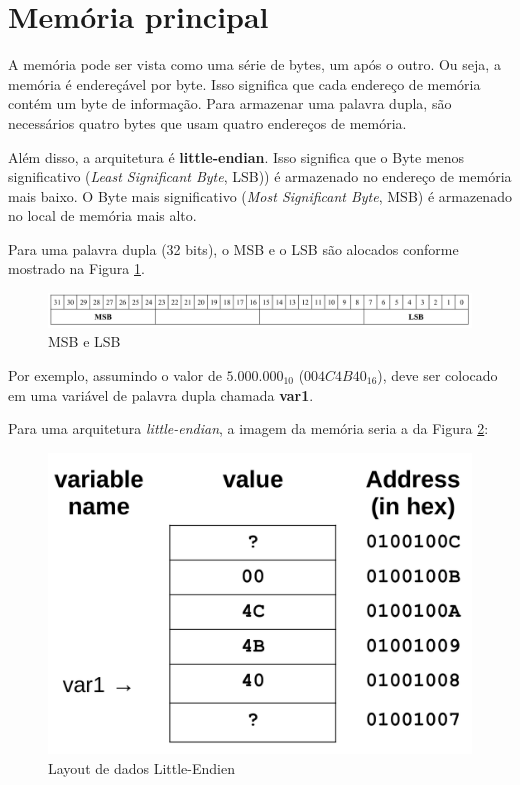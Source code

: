 \section{Memória principal}
A memória pode ser vista como uma série de bytes, um após o outro. Ou seja, a memória é endereçável por byte. Isso significa que cada endereço de memória contém um byte de informação. Para armazenar uma palavra dupla, são necessários quatro bytes que usam quatro endereços de memória.

Além disso, a arquitetura é \textbf{little-endian}. Isso significa que o Byte menos significativo (\textit{Least Significant Byte}, LSB)) é armazenado no endereço de memória mais baixo. O Byte mais significativo (\textit{Most Significant Byte}, MSB) é armazenado no local de memória mais alto.

Para uma palavra dupla (32 bits), o MSB e o LSB são alocados conforme mostrado na Figura \ref{fig:msb}.
\begin{figure}[ht]
	\begin{center}
		\includegraphics[width=\linewidth]{imagens/msb}
	\end{center}
	\caption{MSB e LSB}
	\label{fig:msb}
\end{figure}

Por exemplo, assumindo o valor de $ 5.000.000_{10} $ ($ 004C4B40_{16} $), deve ser colocado em uma variável de palavra dupla chamada \textbf{var1}.

Para uma arquitetura \textit{little-endian}, a imagem da memória seria a da Figura \ref{fig:littleendien}:
\begin{figure}[ht]
	\begin{center}
		\includegraphics[width=0.8\linewidth]{imagens/littleendien}
	\end{center}
	\caption{Layout de dados Little-Endien}
	\label{fig:littleendien}
\end{figure}

